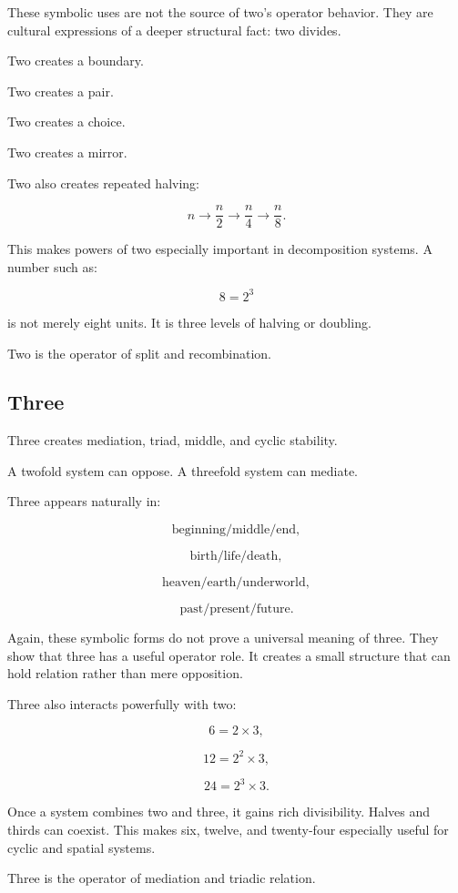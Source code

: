 \documentclass[11pt]{book}
\begin{document}
These symbolic uses are not the source of two's operator behavior. They are cultural expressions of a deeper structural fact: two divides.

Two creates a boundary.

Two creates a pair.

Two creates a choice.

Two creates a mirror.

Two also creates repeated halving:

\[
n \rightarrow \frac{n}{2} \rightarrow \frac{n}{4} \rightarrow \frac{n}{8}.
\]

This makes powers of two especially important in decomposition systems. A number such as:

\[
8 = 2^3
\]

is not merely eight units. It is three levels of halving or doubling.

Two is the operator of split and recombination.

\subsection{Three}

Three creates mediation, triad, middle, and cyclic stability.

A twofold system can oppose. A threefold system can mediate.

Three appears naturally in:

\[
\text{beginning/middle/end},
\]

\[
\text{birth/life/death},
\]

\[
\text{heaven/earth/underworld},
\]

\[
\text{past/present/future}.
\]

Again, these symbolic forms do not prove a universal meaning of three. They show that three has a useful operator role. It creates a small structure that can hold relation rather than mere opposition.

Three also interacts powerfully with two:

\[
6 = 2 \times 3,
\]

\[
12 = 2^2 \times 3,
\]

\[
24 = 2^3 \times 3.
\]

Once a system combines two and three, it gains rich divisibility. Halves and thirds can coexist. This makes six, twelve, and twenty-four especially useful for cyclic and spatial systems.

Three is the operator of mediation and triadic relation.
\end{document}
